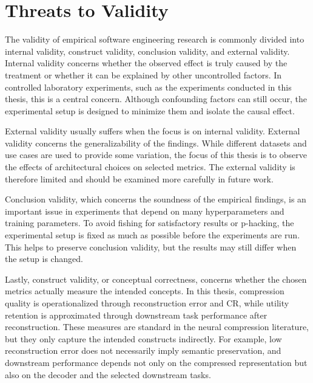 \section{Threats to Validity}

The validity of empirical software engineering research is commonly divided into internal validity, construct validity, conclusion validity, and external validity. Internal validity concerns whether the observed effect is truly caused by the treatment or whether it can be explained by other uncontrolled factors. In controlled laboratory experiments, such as the experiments conducted in this thesis, this is a central concern. Although confounding factors can still occur, the experimental setup is designed to minimize them and isolate the causal effect.

External validity usually suffers when the focus is on internal validity. External validity concerns the generalizability of the findings. While different datasets and use cases are used to provide some variation, the focus of this thesis is to observe the effects of architectural choices on selected metrics. The external validity is therefore limited and should be examined more carefully in future work.

Conclusion validity, which concerns the soundness of the empirical findings, is an important issue in experiments that depend on many hyperparameters and training parameters. To avoid fishing for satisfactory results or p-hacking, the experimental setup is fixed as much as possible before the experiments are run. This helps to preserve conclusion validity, but the results may still differ when the setup is changed.

Lastly, construct validity, or conceptual correctness, concerns whether the chosen metrics actually measure the intended concepts. In this thesis, compression quality is operationalized through reconstruction error and CR, while utility retention is approximated through downstream task performance after reconstruction. These measures are standard in the neural compression literature, but they only capture the intended constructs indirectly. For example, low reconstruction error does not necessarily imply semantic preservation, and downstream performance depends not only on the compressed representation but also on the decoder and the selected downstream tasks.
